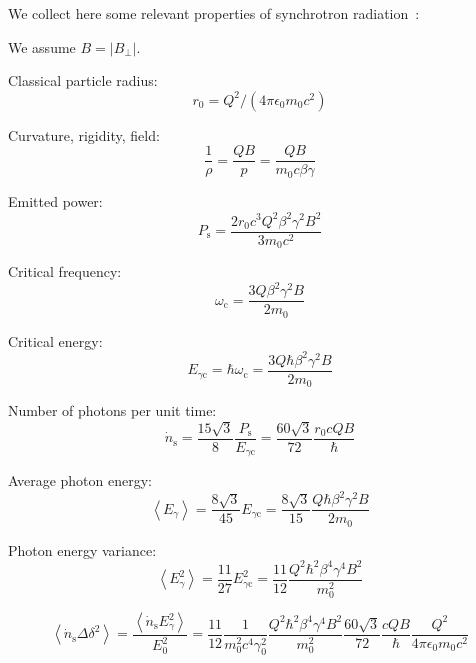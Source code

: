 We collect here some relevant properties of synchrotron radiation~\cite{hofmann_2004}:

We assume $B = |B_\perp|$.

Classical particle radius:
\begin{equation}
r_0=Q^2 /\left(4 \pi \epsilon_0 m_0 c^2\right)
\end{equation}

Curvature, rigidity, field:
\begin{equation}
\frac{1}{\rho}=\frac{Q B}{p}=\frac{Q B}{m_0 c \beta \gamma}
\end{equation}

Emitted power:
\begin{equation}
P_{\mathrm{s}}=\frac{2 r_0 c^3 Q^2 \beta^2 \gamma^2 B^2}{3 m_0 c^2}
\end{equation}



Critical frequency:
\begin{equation}
\omega_{\mathrm{c}}=\frac{3 Q \beta^2 \gamma^2 B }{2 m_0}
\end{equation}

Critical energy:
\begin{equation}
E_{\gamma \mathrm{c}}=\hbar \omega_{\mathrm{c}}
=\frac{3 Q \hbar\beta^2 \gamma^2 B }{2 m_0}
\end{equation}

Number of photons per unit time:
\begin{equation}
\dot{n}_{\mathrm{s}}=\frac{15 \sqrt{3}}{8}\frac{P_{\mathrm{s}}}{E_{\gamma \mathrm{c}}} 
=\frac{60 \sqrt{3}}{72}
\frac{ r_0 c Q B}{\hbar}
\end{equation}

Average photon energy:
\begin{equation}
\left\langle E_\gamma\right\rangle=\frac{8 \sqrt{3}}{45} E_{\gamma \mathrm{c}}
=\frac{8 \sqrt{3}}{15} 
\frac{ Q \hbar\beta^2 \gamma^2 B }{2 m_0}
\end{equation}

Photon energy variance:
\begin{equation}
\left\langle E_\gamma^2\right\rangle=\frac{11}{27} E_{\gamma \mathrm{c}}^2
= 
\frac{11}{12}\frac{ Q^2\hbar^2\beta^4\gamma^4 B^2 }{ m_0^2}
\end{equation}

\begin{equation}
\left\langle \dot{n}_{\mathrm{s}} \Delta \delta ^2\right\rangle
=
\frac{\left\langle \dot{n}_{\mathrm{s}} {E_\gamma^2}
 \right\rangle} {E_0^2}
= 
\frac{11}{12}
\frac{1}{m_0^2 c^4 \gamma_0^2 }
\frac{ Q^2\hbar^2\beta^4\gamma^4 B^2 }{ m_0^2}
\frac{60 \sqrt{3}}{72}
\frac{ c Q B}{\hbar}
\frac{Q^2}{4 \pi \epsilon_0 m_0 c^2}
\end{equation}

